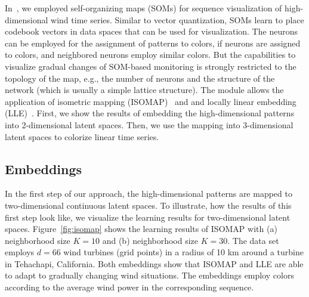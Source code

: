 \documentclass[10pt, conference, compsocconf]{IEEEtran}
\begin{document}
In~\cite{neurocomp}, we employed self-organizing maps (SOMs) for sequence visualization of high-dimensional wind time series. Similar to vector quantization, SOMs learn to place codebook vectors in data spaces that can be used for visualization. The neurons can be employed for the assignment of patterns to colors, if neurons are assigned to colors, and neighbored neurons employ similar colors.  But the capabilities to visualize gradual changes of SOM-based monitoring is strongly restricted to the topology of the map, e.g., the number of neurons and the structure of the network (which is usually a simple lattice structure). The module allows the application of isometric mapping (ISOMAP)~\cite{isomap} and and locally linear embedding (LLE)~\cite{lle}. First, we show the results of embedding the high-dimensional patterns into 2-dimensional latent spaces. Then, we use the mapping into 3-dimensional latent spaces to colorize linear time series.


\subsection{Embeddings}

In the first step of our approach, the high-dimensional patterns are mapped to two-dimensional continuous latent spaces. To illustrate, how the results of this first step look like, we visualize the learning results for two-dimensional latent spaces. Figure~\ref{fig:isomap} shows the learning results of ISOMAP with (a) neighborhood size $K=10$ and (b) neighborhood size $K=30$. The data set employs $d=66$ wind turbines (grid points) in a radius of 10 km around a turbine in Tehachapi, California. Both embeddings show that ISOMAP and LLE are able to adapt to gradually changing wind situations. The embeddings employ colors according to the average wind power in the corresponding sequence.
\end{document}
